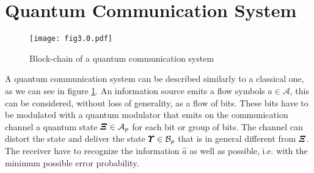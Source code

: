 \section{Quantum Communication System}
    \begin{figure}[t]
        \begin{center}
            \texttt{[image: fig3.0.pdf]}
            \caption{Block-chain of a quantum communication system}
            \label{fig:3.0}
        \end{center}
    \end{figure}
    A quantum communication system can be described similarly to a classical one, as we can 
    see in figure \ref{fig:3.0}. An information source emits a flow symbols $a \in \mathcal{A}$, this
    can be considered, without loss of generality, as a flow of bits. These bits have to be 
    modulated with a quantum modulator that emits on the communication channel a quantum state
    $\Operator{\varXi} \in \mathcal{A}_p$ for each bit or group of bits. The channel can distort the
    state and deliver the state $\Operator{\varUpsilon} \in \mathcal{B}_p$ that is in general 
    different from $\Operator{\varXi}$.
    The receiver have to recognize the information $\hat{a}$ as well as possible, i.e. with 
    the minimum possible error probability.
